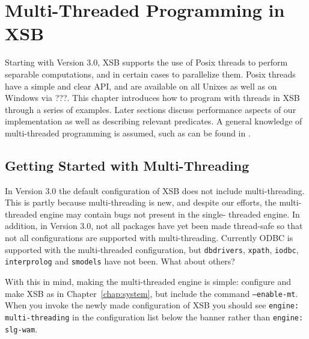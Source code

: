 \chapter{Multi-Threaded Programming in XSB} \label{chap:threads}

Starting with Version 3.0, XSB supports the use of Posix threads to
perform separable computations, and in certain cases to parallelize
them.  Posix threads have a simple and clear API, and are available on
all Unixes as well as on Windows via ???.  This chapter introduces how
to program with threads in XSB through a series of examples.  Later
sections discuss performance aspects of our implementation as well as
describing relevant predicates.  A general knowledge of multi-threaded
programming is assumed, such as can be found in \cite{LewB98,Bute97}.

\section{Getting Started with Multi-Threading}
%
In Version 3.0 the default configuration of XSB does not include
multi-threading.  This is partly because multi-threading is new, and
despite our efforts, the multi-threaded engine may contain bugs not
present in the single-
threaded engine.  In addition, in Version 3.0,
not all packages have yet been made thread-safe so that not all
configurations are supported with multi-threading.  Currently ODBC is
supported with the multi-threaded configuration, but {\tt dbdrivers},
{\tt xpath}, {\tt iodbc}, {\tt interprolog} and {\tt smodels} have not
been. {\sc What about others?}

With this in mind, making the multi-threaded engine is simple:
configure and make XSB as in Chapter~\ref{chap:system}, but include
the command {\tt --enable-mt}.  When you invoke the newly made
configuration of XSB you should see {\tt engine: multi-threading} in
the configuration list below the banner rather than {\tt engine:
  slg-wam}.

